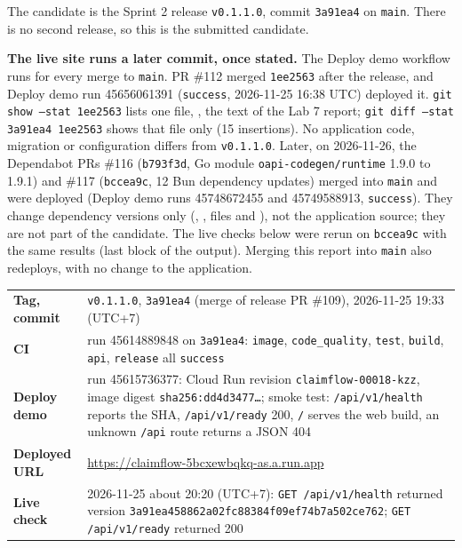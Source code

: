 \label{E:1}

The candidate is the Sprint 2 release \texttt{v0.1.1.0}, commit \texttt{3a91ea4} on \texttt{main}. There is no second release, so this is the submitted candidate.

\textbf{The live site runs a later commit, once stated.} The Deploy demo workflow runs for every merge to \texttt{main}. PR \#112 merged \texttt{1ee2563} after the release, and Deploy demo run 45656061391 (\texttt{success}, 2026-11-25 16:38 UTC) deployed it. \texttt{git show --stat 1ee2563} lists one file, , the text of the Lab 7 report; \texttt{git diff --stat 3a91ea4 1ee2563} shows that file only (15 insertions). No application code, migration or configuration differs from \texttt{v0.1.1.0}. Later, on 2026-11-26, the Dependabot PRs \#116 (\texttt{b793f3d}, Go module \texttt{oapi-codegen/runtime} 1.9.0 to 1.9.1) and \#117 (\texttt{bccea9c}, 12 Bun dependency updates) merged into \texttt{main} and were deployed (Deploy demo runs 45748672455 and 45749588913, \texttt{success}). They change dependency versions only (, ,  files and ), not the application source; they are not part of the candidate. The live checks below were rerun on \texttt{bccea9c} with the same results (last block of the output). Merging this report into \texttt{main} also redeploys, with no change to the application.

\begin{center}\small
\begin{tabular}{@{}>{\bfseries}p{3.6cm}p{12.7cm}@{}}
\toprule
Tag, commit & \texttt{v0.1.1.0}, \texttt{3a91ea4} (merge of release PR \#109), 2026-11-25 19:33 (UTC+7) \\
CI & run 45614889848 on \texttt{3a91ea4}: \texttt{image}, \texttt{code\_quality}, \texttt{test}, \texttt{build}, \texttt{api}, \texttt{release} all \texttt{success} \\
Deploy demo & run 45615736377: Cloud Run revision \texttt{claimflow-00018-kzz}, image digest \texttt{sha256:dd4d3477\ldots}; smoke test: \texttt{/api/v1/health} reports the SHA, \texttt{/api/v1/ready} 200, \texttt{/} serves the web build, an unknown \texttt{/api} route returns a JSON 404 \\
Deployed URL & \url{https://claimflow-5bcxewbqkq-as.a.run.app} \\
Live check & 2026-11-25 about 20:20 (UTC+7): \texttt{GET /api/v1/health} returned version \texttt{3a91ea458862a02fc88384f09ef74b7a502ce762}; \texttt{GET /api/v1/ready} returned 200 \\
\bottomrule
\end{tabular}
\end{center}

